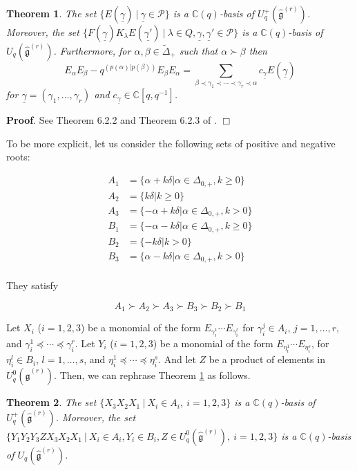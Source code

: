 \documentclass[12pt]{amsart}
\newtheorem{thm}{Theorem}[section]
\numberwithin{equation}{section}
\newcommand{\dem }{\noindent\textbf{Proof}. }
\newcommand{\findem }{\hfill $\Box$ \vskip0.5cm }
\newcommand{\C}{\ensuremath{\mathbb{C}}}
\newcommand{\g}{\ensuremath{\mathfrak{g}}}
\newcommand{\mc}[1]{\mathcal{#1}}
\begin{document}
\begin{thm}\label{TwistPBW}
    The set $\{ E(\underline{\gamma}) \ | \ \underline{\gamma} \in \mc{P} \}$ is a $\C(q)$-basis of $U_q^{+}(\hat{\g}^{(r)})$. Moreover, the set $\{ F(\underline{\gamma}) K_\lambda E(\underline{\gamma'}) \ |\ \lambda\in Q, \underline{\gamma}, \underline{\gamma}'\in \mc{P} \}$ is a $\C(q)$-basis of $U_q(\hat{\g}^{(r)})$. Furthermore, for $\alpha, \beta \in \tilde{\Delta}_+$ such that $\alpha \succ \beta$ then
    $$ E_{\alpha}E_{\beta} - q^{(p(\alpha) | p(\beta))}E_{\beta}E_{\alpha} = \sum_{\beta \prec \gamma_1 \prec \cdots \prec \gamma_r \prec \alpha} c_{\underline{\gamma}}E(\underline{\gamma}) $$
    for $\underline{\gamma} = (\gamma_1, \ldots, \gamma_r)$ and $c_{\underline{\gamma}} \in \C[q,q^{-1}]$.
    
\end{thm}

\dem See Theorem 6.2.2 and Theorem 6.2.3 of \cite{D}. \findem

To be more explicit, let us consider the following sets of positive and negative roots:

\begin{align*}
    A_1 &= \{ \alpha + k \delta | \alpha \in \Delta_{0,+}, k\geq 0 \} \\
    A_2 &= \{ k\delta | k\geq 0 \} \\
    A_3 &= \{ -\alpha + k \delta | \alpha \in \Delta_{0,+}, k > 0 \} \\
    B_1 &= \{ -\alpha - k \delta | \alpha \in \Delta_{0,+}, k\geq 0 \} \\
    B_2 &= \{ -k\delta | k > 0 \} \\
    B_3 &= \{ \alpha - k \delta | \alpha \in \Delta_{0,+}, k > 0 \} \\
\end{align*}

They satisfy 

$$ A_1 \succ A_2 \succ A_3 \succ B_3 \succ B_2 \succ B_1 $$

Let $X_i$ ($i = 1,2,3$) be a monomial of the form $E_{\gamma_i^1}\cdots E_{\gamma_i^r}$ for $\gamma_i^j \in A_i$, $j=1,\ldots, r$, and $\gamma_i^1 \preceq \cdots \preceq \gamma_i^r$. Let $Y_i$ ($i = 1,2,3$) be a monomial of the form $E_{\eta_i^1}\cdots E_{\eta_i^s}$, for $\eta_i^l \in B_i$, $l=1,\ldots, s$, and $\eta_i^1 \preceq \cdots \preceq \eta_i^s$. And let $Z$ be a product of elements in $U_q^0(\hat{\g}^{(r)})$. Then, we can rephrase Theorem \ref{TwistPBW} as follows.

\begin{thm}\label{PBWBasisbasic}
    The set $\{ X_3X_2X_1 \  | \ X_i \in A_i, \ i=1,2,3\}$ is a $\C(q)$-basis of $U_q^{+}(\hat{\g}^{(r)})$. Moreover, the set $\{ Y_1Y_2Y_3ZX_3X_2X_1 \  | \ X_i \in A_i, Y_i\in B_i, Z \in  U_q^0(\hat{\g}^{(r)}), \ i= 1,2,3 \}$ is a $\C(q)$-basis of $U_q(\hat{\g}^{(r)})$.
\end{thm}
\end{document}
